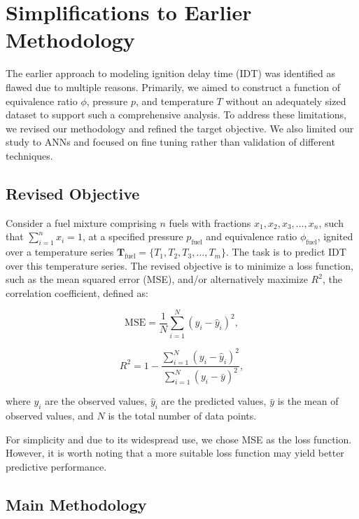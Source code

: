 \documentclass[12pt]{report}
\begin{document}
\section{Simplifications to Earlier Methodology}

The earlier approach to modeling ignition delay time (IDT) was identified as flawed due to multiple reasons. Primarily, we aimed to construct a function of equivalence ratio $\phi$, pressure $p$, and temperature $T$ without an adequately sized dataset to support such a comprehensive analysis. To address these limitations, we revised our methodology and refined the target objective. We also limited our study to ANNs and focused on fine tuning rather than validation of different techniques.

\subsection{Revised Objective}

Consider a fuel mixture comprising $n$ fuels with fractions $x_1, x_2, x_3, \ldots, x_n$, such that $\sum_{i=1}^n x_i = 1$, at a specified pressure $p_{\text{fuel}}$ and equivalence ratio $\phi_{\text{fuel}}$, ignited over a temperature series $\mathbf{T}_{\text{fuel}} = \{T_1, T_2, T_3, \ldots, T_m\}$. The task is to predict IDT over this temperature series. The revised objective is to minimize a loss function, such as the mean squared error (MSE), and/or alternatively maximize $R^2$, the correlation coefficient, defined as:

\[
\text{MSE} = \frac{1}{N} \sum_{i=1}^N (y_i - \hat{y}_i)^2,
\]

\[
R^2 = 1 - \frac{\sum_{i=1}^N (y_i - \hat{y}_i)^2}{\sum_{i=1}^N (y_i - \bar{y})^2},
\]

where $y_i$ are the observed values, $\hat{y}_i$ are the predicted values, $\bar{y}$ is the mean of observed values, and $N$ is the total number of data points.

For simplicity and due to its widespread use, we chose MSE as the loss function. However, it is worth noting that a more suitable loss function may yield better predictive performance.

\subsection{Main Methodology}
\end{document}
